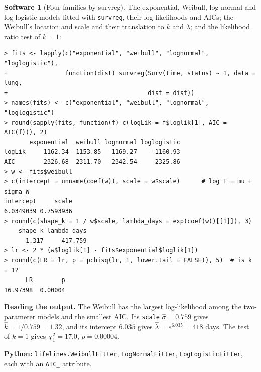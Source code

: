 \documentclass[11pt,a4paper]{article}
\numberwithin{equation}{section}
\theoremstyle{definition}
\newtheorem{software}[thm]{Software}
\begin{document}
\begin{software}[Four families by survreg]
\label{sw:families}
The exponential, Weibull, log-normal and log-logistic models fitted with \texttt{survreg}, their log-likelihoods and AICs; the Weibull's location and scale and their translation to $k$ and $\lambda$; and the likelihood ratio test of $k = 1$:
{\small\begin{verbatim}
> fits <- lapply(c("exponential", "weibull", "lognormal", "loglogistic"),
+                function(dist) survreg(Surv(time, status) ~ 1, data = lung,
+                                       dist = dist))
> names(fits) <- c("exponential", "weibull", "lognormal", "loglogistic")
> round(sapply(fits, function(f) c(logLik = f$loglik[1], AIC = AIC(f))), 2)
       exponential  weibull lognormal loglogistic
logLik    -1162.34 -1153.85  -1169.27    -1160.93
AIC        2326.68  2311.70   2342.54     2325.86
> w <- fits$weibull
> c(intercept = unname(coef(w)), scale = w$scale)      # log T = mu + sigma W
intercept     scale 
6.0349039 0.7593936 
> round(c(shape_k = 1 / w$scale, lambda_days = exp(coef(w))[[1]]), 3)
    shape_k lambda_days 
      1.317     417.759 
> lr <- 2 * (w$loglik[1] - fits$exponential$loglik[1])
> round(c(LR = lr, p = pchisq(lr, 1, lower.tail = FALSE)), 5)  # is k = 1?
      LR        p 
16.97398  0.00004 
\end{verbatim}}
\textbf{Reading the output.} The Weibull has the largest log-likelihood among the two-parameter models and the smallest AIC. Its \texttt{scale} $\hat\sigma = 0.759$ gives $\hat k = 1/0.759 = 1.32$, and its intercept $6.035$ gives $\hat\lambda = e^{6.035} = 418$ days. The test of $k = 1$ gives $\chi^2_1 = 17.0$, $p = 0.00004$.

\textbf{Python:} \texttt{lifelines.WeibullFitter}, \texttt{LogNormalFitter}, \texttt{LogLogisticFitter}, each with an \texttt{AIC\_} attribute.
\end{software}
\end{document}
